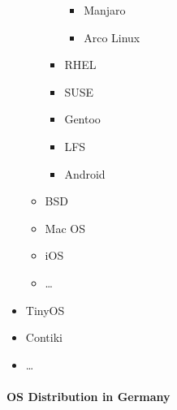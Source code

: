\documentclass[
]{article}
\providecommand{\tightlist}{%
  \setlength{\itemsep}{0pt}\setlength{\parskip}{0pt}}
\begin{document}
\begin{itemize}
\begin{itemize}
\begin{itemize}
      \begin{itemize}
      \tightlist
      \item
        Manjaro
      \item
        Arco Linux
      \end{itemize}
    \item
      RHEL
    \item
      SUSE
    \item
      Gentoo
    \item
      LFS
    \item
      Android
    \end{itemize}
  \item
    BSD
  \item
    Mac OS
  \item
    iOS
  \item
    \ldots{}
  \end{itemize}
\item
  TinyOS
\item
  Contiki
\item
  \ldots{}
\end{itemize}

\hypertarget{os-distribution-in-germany}{%
\paragraph{OS Distribution in
Germany}\label{os-distribution-in-germany}}
\end{document}
